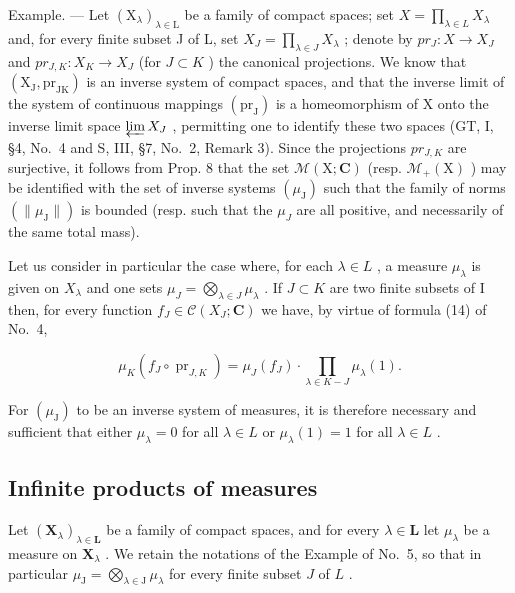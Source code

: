 Example. --- Let \((\mathrm{X}_{\lambda})_{\lambda\in\mathrm{L}}\) be a family of compact spaces; set \(X=\prod_{\lambda\in L}X_{\lambda}\) and, for every finite subset J of L, set \(X_{J}=\prod_{\lambda\in J}X_{\lambda}\) ; denote by \(pr_{J}:X\to X_{J}\) and \(pr_{J,K}:X_{K}\to X_{J}\) (for \(J\subset K\) ) the canonical projections. We know that \((\mathrm{X}_{\mathrm{J}},\mathrm{pr}_{\mathrm{JK}})\) is an inverse system of compact spaces, and that the inverse limit of the system of continuous mappings \((\mathrm{pr}_{\mathrm{J}})\) is a homeomorphism of X onto the inverse limit space \(\varprojlim X_{J}\) , permitting one to identify these two spaces (GT, I, §4, No.~4 and S, III, §7, No.~2, Remark 3). Since the projections \(pr_{J,K}\) are surjective, it follows from Prop. 8 that the set \(\mathcal{M}(\mathrm{X};\mathbf{C})\) (resp. \(\mathcal{M}_{+}(\mathrm{X})\) ) may be identified with the set of inverse systems \((\mu_{\mathrm{J}})\) such that the family of norms \((\|\mu_{\mathrm{J}}\|)\) is bounded (resp. such that the \(\mu_{J}\) are all positive, and necessarily of the same total mass).

Let us consider in particular the case where, for each \(\lambda \in L\) , a measure \(\mu_{\lambda}\) is given on \(X_{\lambda}\) and one sets \(\mu_{J} = \bigotimes_{\lambda \in J} \mu_{\lambda}\) . If \(J \subset K\) are two finite subsets of I then, for every function \(f_{J} \in \mathcal{C}(X_{J}; \mathbf{C})\) we have, by virtue of formula (14) of No.~4,

\[
\mu_ {K} \left(f _ {J} \circ \operatorname{pr} _ {J, K}\right) = \mu_ {J} \left(f _ {J}\right) \cdot \prod_ {\lambda \in K - J} \mu_ {\lambda} (1).\tag{17}
\]

For \((\mu_{\mathrm{J}})\) to be an inverse system of measures, it is therefore necessary and sufficient that either \(\mu_{\lambda}=0\) for all \(\lambda\in L\) or \(\mu_{\lambda}(1)=1\) for all \(\lambda\in L\) .

\subsection{Infinite products of measures}

Let \((\mathbf{X}_{\lambda})_{\lambda \in \mathbf{L}}\) be a family of compact spaces, and for every \(\lambda \in \mathbf{L}\) let \(\mu_{\lambda}\) be a measure on \(\mathbf{X}_{\lambda}\) . We retain the notations of the Example of No.~5, so that in particular \(\mu_{\mathrm{J}} = \bigotimes_{\lambda \in \mathrm{J}} \mu_{\lambda}\) for every finite subset \(J\) of \(L\) .

